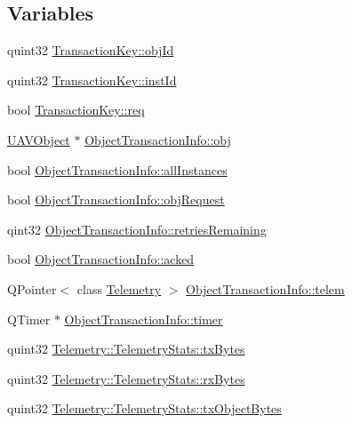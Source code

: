 \subsection*{\-Variables}
\begin{DoxyCompactItemize}
\item 
quint32 \hyperlink{group___u_a_v_talk_plugin_ga23b79980c6f897e84ca1b88c5bb532ad}{\-Transaction\-Key\-::obj\-Id}
\item 
quint32 \hyperlink{group___u_a_v_talk_plugin_ga3d92643b78ea3e10cd9ac1ac2cc4b5f7}{\-Transaction\-Key\-::inst\-Id}
\item 
bool \hyperlink{group___u_a_v_talk_plugin_gafe5007a7f451f47110150ee417594a38}{\-Transaction\-Key\-::req}
\item 
\hyperlink{class_u_a_v_object}{\-U\-A\-V\-Object} $\ast$ \hyperlink{group___u_a_v_talk_plugin_ga9ad43239e470da9249f214e43521bddb}{\-Object\-Transaction\-Info\-::obj}
\item 
bool \hyperlink{group___u_a_v_talk_plugin_gaf134962f4df09323cf89245e3bc32f6e}{\-Object\-Transaction\-Info\-::all\-Instances}
\item 
bool \hyperlink{group___u_a_v_talk_plugin_ga35e10d2ea8bcd4f4bd1e32db43857e2c}{\-Object\-Transaction\-Info\-::obj\-Request}
\item 
qint32 \hyperlink{group___u_a_v_talk_plugin_gaf7cfad07635a777272c96c4b2fb2284b}{\-Object\-Transaction\-Info\-::retries\-Remaining}
\item 
bool \hyperlink{group___u_a_v_talk_plugin_ga27c9898b3e1a5940f0340891578f6ea5}{\-Object\-Transaction\-Info\-::acked}
\item 
\-Q\-Pointer$<$ class \hyperlink{class_telemetry}{\-Telemetry} $>$ \hyperlink{group___u_a_v_talk_plugin_ga1df77178093618626fe21d5bc58b03f4}{\-Object\-Transaction\-Info\-::telem}
\item 
\-Q\-Timer $\ast$ \hyperlink{group___u_a_v_talk_plugin_gaf400de9c7d9b37a52e821b1a7bc6580e}{\-Object\-Transaction\-Info\-::timer}
\item 
quint32 \hyperlink{group___u_a_v_talk_plugin_ga349d8c0f2aac815d79b13e54f818658c}{\-Telemetry\-::\-Telemetry\-Stats\-::tx\-Bytes}
\item 
quint32 \hyperlink{group___u_a_v_talk_plugin_gadda927fbb6858f5e60b6daf16d5bc94e}{\-Telemetry\-::\-Telemetry\-Stats\-::rx\-Bytes}
\item 
quint32 \hyperlink{group___u_a_v_talk_plugin_ga5c315107de95913671e9bd51ce699e1f}{\-Telemetry\-::\-Telemetry\-Stats\-::tx\-Object\-Bytes}
\item 

\end{DoxyCompactItemize}
